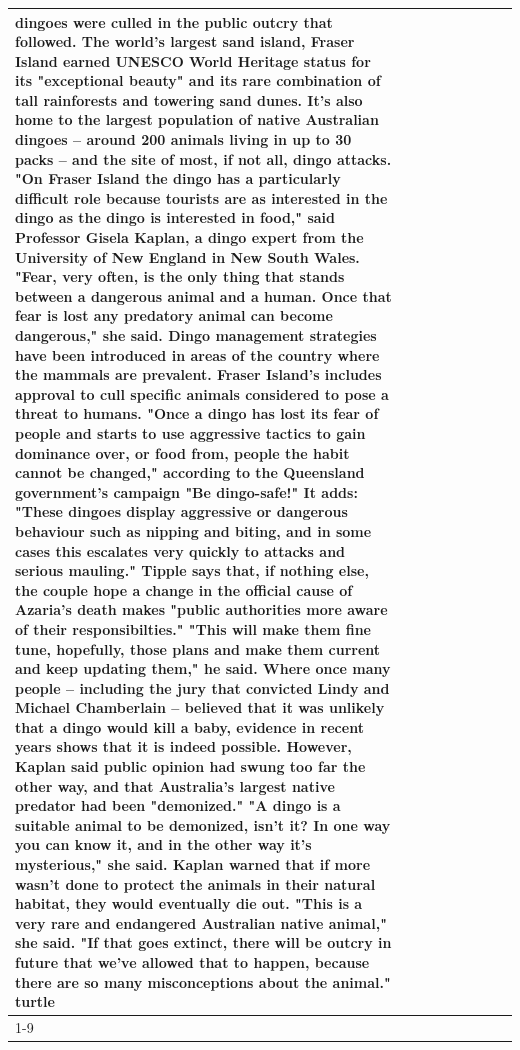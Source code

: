 \begin{table}[H]
\begin{tabular}{lllrlllll}
dingoes were culled in the public outcry that followed. The world's largest sand island, Fraser Island earned UNESCO World Heritage status for its "exceptional beauty" and its rare combination of tall rainforests and towering sand dunes. It's also home to the largest population of native Australian dingoes -- around 200 animals living in up to 30 packs -- and the site of most, if not all, dingo attacks. "On Fraser Island the dingo has a particularly difficult role because tourists are as interested in the dingo as the dingo is interested in food," said Professor Gisela Kaplan, a dingo expert from the University of New England in New South Wales. "Fear, very often, is the only thing that stands between a dangerous animal and a human. Once that fear is lost any predatory animal can become dangerous," she said. Dingo management strategies have been introduced in areas of the country where the mammals are prevalent. Fraser Island's includes approval to cull specific animals considered to pose a threat to humans. "Once a dingo has lost its fear of people and starts to use aggressive tactics to gain dominance over, or food from, people the habit cannot be changed," according to the Queensland government's campaign "Be dingo-safe!" It adds: "These dingoes display aggressive or dangerous behaviour such as nipping and biting, and in some cases this escalates very quickly to attacks and serious mauling." Tipple says that, if nothing else, the couple hope a change in the official cause of Azaria's death makes "public authorities more aware of their responsibilties." "This will make them fine tune, hopefully, those plans and make them current and keep updating them," he said. Where once many people -- including the jury that convicted Lindy and Michael Chamberlain -- believed that it was unlikely that a dingo would kill a baby, evidence in recent years shows that it is indeed possible. However, Kaplan said public opinion had swung too far the other way, and that Australia's largest native predator had been "demonized." "A dingo is a suitable animal to be demonized, isn't it? In one way you can know it, and in the other way it's mysterious," she said. Kaplan warned that if more wasn't done to protect the animals in their natural habitat, they would eventually die out. "This is a very rare and endangered Australian native animal," she said. "If that goes extinct, there will be outcry in future that we've allowed that to happen, because there are so many misconceptions about the animal." turtle \\
\cline{1-9}

\end{tabular}
\end{table}
